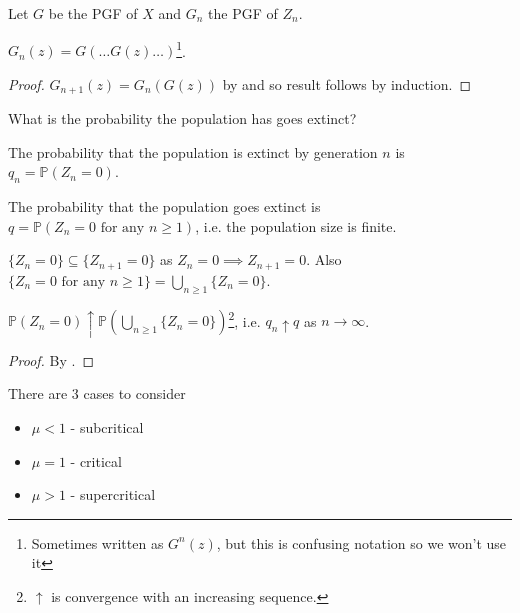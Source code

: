 \begin{notation} \label{not:branchpgf}
    Let $G$ be the PGF of $X$ and $G_n$ the PGF of $Z_n$.
\end{notation} 

\begin{theorem} \label{thm:branchpgf}
    $G_n(z) = G(\dots G(z) \dots)$\footnote{Sometimes written as $G^n(z)$, but this is confusing notation so we won't use it}.
\end{theorem} 

\begin{proof}
    $G_{n + 1}(z) = G_n(G(z))$ by  and so result follows by induction.
\end{proof}

\begin{question}
    What is the probability the population has goes extinct?
\end{question} 

\begin{definition}
    The probability that the population is extinct by generation $n$ is $q_n = \mathbb{P}(Z_n = 0)$.
\end{definition}

\begin{definition}
    The probability that the population goes extinct is $q = \mathbb{P}(Z_n = 0 \text{ for any } n \geq 1)$, i.e. the population size is finite.
\end{definition}

\begin{note}
    $\{Z_n = 0\} \subseteq \{Z_{n + 1} = 0\}$ as $Z_n = 0 \implies Z_{n + 1} = 0$.
    Also $\{Z_n = 0 \text{ for any } n \geq 1\} = \bigcup_{n \geq 1} \{Z_n = 0\}$.
\end{note} 

\begin{theorem}
    $\mathbb{P}(Z_n = 0) \uparrow \mathbb{P}(\bigcup_{n \geq 1} \{Z_n = 0\})$\footnote{$\uparrow$ is convergence with an increasing sequence.}, i.e. $q_n \uparrow q$ as $n \to \infty$.
\end{theorem} 

\begin{proof}
    By .
\end{proof} 

There are 3 cases to consider
\begin{itemize}
    \item $\mu < 1$ - subcritical
    \item $\mu = 1$ - critical
    \item $\mu > 1$ - supercritical
\end{itemize} 

